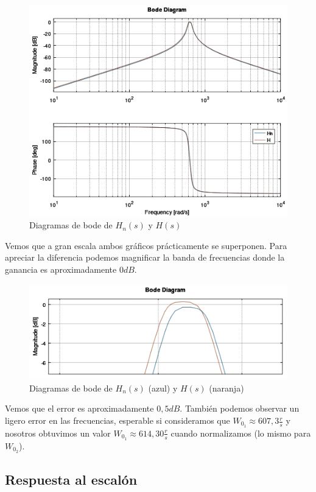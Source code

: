 \documentclass[11pt,a4paper]{report}
\begin{document}
\begin{figure}[h!]
\centering
\includegraphics[scale=0.7]{DiagramasBodeComp.png}
\caption{Diagramas de bode de $H_{n}(s)$ y $H(s)$}
\end{figure}

Vemos que a gran escala ambos gráficos prácticamente se superponen. Para apreciar la diferencia podemos magnificar la banda de frecuencias donde la ganancia es aproximadamente $0dB$.

\begin{figure}[h!]
\centering
\includegraphics[scale=0.7]{DiagramasBodeCloseComp.png}
\caption{Diagramas de bode de $H_{n}(s)$ (azul) y $H(s)$ (naranja)}
\end{figure}

Vemos que el error es aproximadamente $0,5dB$. También podemos observar un ligero error en las frecuencias, esperable si consideramos que $W_{0_{1}} \approx 607,3\frac{r}{s}$ y nosotros obtuvimos un valor $W_{0_{1}} \approx 614,30\frac{r}{s}$ cuando normalizamos (lo mismo para $W_{0_{2}}$).

\subsection*{Respuesta al escalón}
\end{document}
